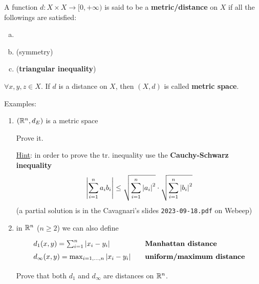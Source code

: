 \begin{defn}
A function $d:X\times X\to[0,+\infty)$ is said to be a \textbf{metric/distance} on $X$ if all the followings are satisfied:
\begin{enumerate}[(a)]
    \item {}
    \item { (symmetry)}
    \item { (\textbf{triangular inequality})}
\end{enumerate}
$\forall x,y,z\in X$. If $d$ is a distance on $X$, then $(X,d)$ is called \textbf{metric space}.
\end{defn}

Examples:
\begin{enumerate}
    \item $\left( \mathbb{R}^n,d_E \right)$ is a metric space

    \begin{home}
    Prove it.

    \underline{Hint}: in order to prove the tr. inequality use the \textbf{Cauchy-Schwarz inequality}
    \begin{equation*}
        \left\lvert \sum^{n}_{i=1}a_ib_i \right\rvert\leq\sqrt{\sum^{n}_{i=1}\left\lvert a_i \right\rvert^2 } \cdot \sqrt{\sum^{n}_{i=1}\left\lvert b_i \right\rvert^2 }
    \end{equation*}
    \newline
    \newline
    \newline
    (a partial solution is in the Cavagnari's slides \texttt{2023-09-18.pdf} on Webeep)
    \end{home}

    \item in $\mathbb{R}^n$ ($n\geq 2$) we can also define
    \begin{equation*}
    {\renewcommand*{\arraystretch}{1.5}
    \begin{array}{ll}
    d_1(x,y)=\sum^{n}_{i=1}\abs{x_i-y_i} &\quad\textbf{Manhattan distance} \\
    d_\infty(x,y)=\max_{i=1,...,n} \abs{x_i-y_i} &\quad\textbf{uniform/maximum distance} 
    \end{array}}
    \end{equation*}

    \begin{home}
    Prove that both $d_1$ and $d_\infty$ are distances on $\mathbb{R}^n$.


\end{home}
\end{enumerate}
